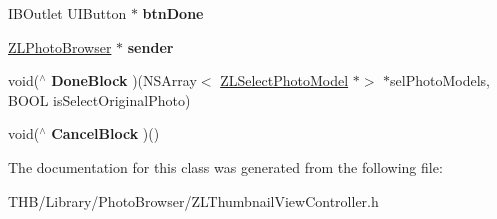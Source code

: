 \begin{DoxyCompactItemize}
\item 
\mbox{\label{interface_z_l_thumbnail_view_controller_ac0af9e40c98e939a45b5a90b3b41b001}} 
I\+B\+Outlet U\+I\+Button $\ast$ {\bfseries btn\+Done}
\item 
\mbox{\label{interface_z_l_thumbnail_view_controller_aa1457f4ba933cae30ec92447a213f412}} 
\mbox{\hyperlink{interface_z_l_photo_browser}{Z\+L\+Photo\+Browser}} $\ast$ {\bfseries sender}
\item 
\mbox{\label{interface_z_l_thumbnail_view_controller_ab56dd2683f270236577d70593b867887}} 
void($^\wedge$ {\bfseries Done\+Block} )(N\+S\+Array$<$ \mbox{\hyperlink{interface_z_l_select_photo_model}{Z\+L\+Select\+Photo\+Model}} $\ast$$>$ $\ast$sel\+Photo\+Models, B\+O\+OL is\+Select\+Original\+Photo)
\item 
\mbox{\label{interface_z_l_thumbnail_view_controller_af090e380d30daca8370c6a3491576e99}} 
void($^\wedge$ {\bfseries Cancel\+Block} )()
\end{DoxyCompactItemize}


The documentation for this class was generated from the following file\+:\begin{DoxyCompactItemize}
\item 
T\+H\+B/\+Library/\+Photo\+Browser/Z\+L\+Thumbnail\+View\+Controller.\+h\end{DoxyCompactItemize}
